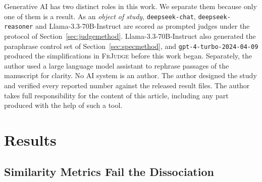 \documentclass{BVP_JCLLT}
\newcommand{\rev}[1]{#1}
\newcommand{\rev}[1]{{\color{revcol}#1}}
\begin{document}
\rev{Generative AI has two distinct roles in this work. We separate them because
only one of them is a result. As an \emph{object of study},
\texttt{deepseek-chat}, \texttt{deepseek-reasoner} and Llama-3.3-70B-Instruct
are scored as prompted judges under the protocol of
Section~\ref{sec:judgemethod}. Llama-3.3-70B-Instruct also generated the
paraphrase control set of Section~\ref{sec:specmethod}, and
\texttt{gpt-4-turbo-2024-04-09} produced the simplifications in \textsc{FrJudge}
before this work began. Separately, the author used a large language model
assistant to rephrase passages of the manuscript for clarity. No AI system is an
author. The author designed the study and verified every reported number
against the released result files. The author takes full responsibility for the
content of this article, including any part produced with the help of such a
tool.}

\begin{table}
\centering
\caption{\rev{\textsc{LexFlip}. \emph{ident.} and \emph{unrel.} are the mean
identical-pair and unrelated-pair scores. We min--max normalise over all
$3\times\numedits$ item scores of each metric, so these means need not equal
$1$ and $0$. \emph{discrim.} is the share of items with $m(s,s) > m(s,s')$
strictly. \emph{ties} is the share with $m(s,s) = m(s,s')$, and ties count as
misses.
\emph{Margin} is the share of the identical-to-unrelated range spent on the
legal edit, with a $95\%$ bootstrap interval. The last two columns give it
separately for the \numeditsTierOne\ tier-1 and $63$ tier-2 items.}}\label{tab:challenge}
\footnotesize
\rev{}
\end{table}

\section{Results}\label{sec:results}

\subsection{Similarity Metrics Fail the Dissociation}\label{sec:diagnostic}
\end{document}
